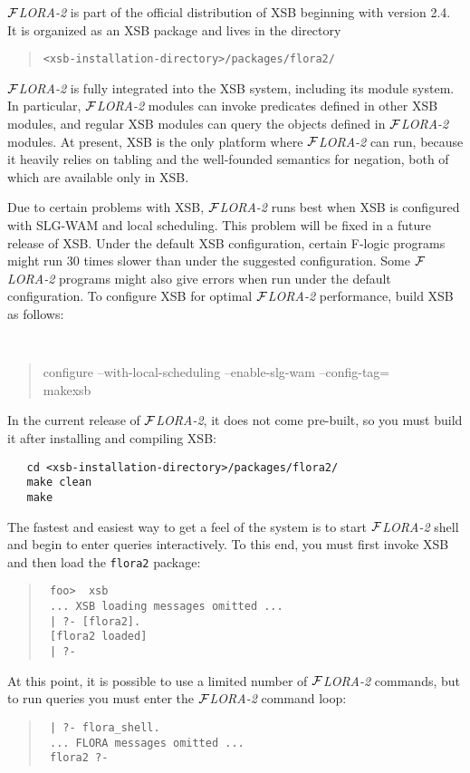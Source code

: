 \documentclass[11pt]{article}
\newcommand{\FLORA}{{\mbox{${\cal F}${\small\it LORA}\rm\emph{-2}}}\xspace}
\newcommand{\fl}{\mbox{F-logic}\xspace}
\begin{document}
\FLORA is part of the official distribution of XSB beginning with version
2.4. It is organized as an XSB package and lives in the directory
\begin{quote}
 \verb|<xsb-installation-directory>/packages/flora2/|  
\end{quote}
\FLORA is fully integrated into the XSB system, including its module
system. In particular, \FLORA modules can invoke predicates defined in
other XSB modules, and regular XSB modules can query the objects defined in
\FLORA modules. At present, XSB is the only platform where \FLORA can run,
because it heavily relies on tabling and the well-founded semantics for
negation, both of which are available only in XSB.

Due to certain problems with XSB, \FLORA runs best when XSB is configured
with SLG-WAM and local scheduling. This problem will be fixed in a future
release of XSB. Under the default XSB configuration, certain \fl programs might
run 30 times slower than under the suggested configuration. Some \FLORA
programs might also give errors when run under the default configuration.
To configure XSB for optimal \FLORA performance, build XSB as follows:
{\tt
\begin{quote}
 configure --with-local-scheduling --enable-slg-wam --config-tag=\\
 makexsb
\end{quote}
}
In the current release of \FLORA, it does not come pre-built, so you must
build it after installing and compiling XSB:
\begin{verbatim}
   cd <xsb-installation-directory>/packages/flora2/
   make clean
   make
\end{verbatim}

The fastest and easiest way to get a feel of the system
is to start \FLORA shell and begin to enter queries interactively.  To
this end, you must first invoke XSB and then load the {\tt flora2}
package:
\begin{quote}
  \tt
foo>~~xsb  \\
\tt
... XSB loading messages omitted ...\\
\tt
| ?- [flora2].\\
\tt
[flora2 loaded]\\
\tt
| ?-
\end{quote}
At this point, it is possible to use a limited number of \FLORA
commands, but to run queries you must enter the \FLORA command loop:
\begin{quote}
  \tt
| ?- flora\_shell.  \\
 \tt
... FLORA messages omitted ... \\
 \tt
flora2 ?-
\end{quote}
\end{document}
